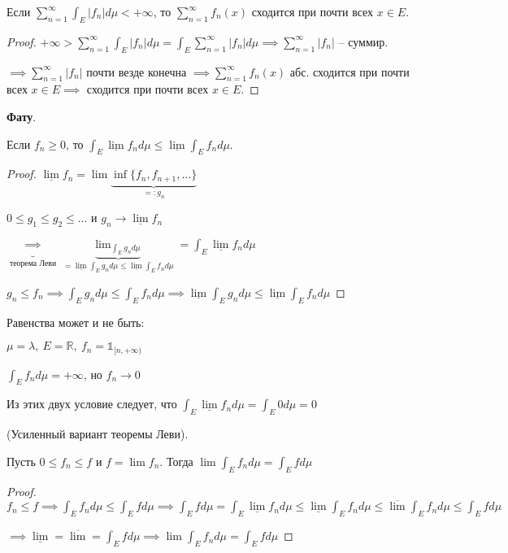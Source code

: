 \begin{consequence}
    Если $\sum_{n=1}^{\infty} \int_E{|f_n| d \mu} < +\infty$, то $\sum_{n=1}^{\infty} f_n(x)$ сходится при почти всех $x \in E$.
\end{consequence}
\begin{proof}
    $+\infty > \sum_{n=1}^{\infty} \int_E{|f_n| d \mu} = \int_E{\sum_{n=1}^{\infty} |f_n| d \mu} \implies \sum_{n=1}^{\infty} |f_n|$ -- суммир.

    $\implies \sum_{n=1}^{\infty} |f_n|$ почти везде конечна $\implies \sum_{n=1}^{\infty} f_n(x)$ абс. сходится при почти всех $x \in E \implies$ сходится при почти всех $x \in E$.
\end{proof}

\begin{lemma}
    \textbf{Фату}.

    Если $f_n \geq 0$, то $\int_E{\underline{\lim}{f_n d \mu}} \leq \underline{\lim}{\int_E{f_n d \mu}}$.
\end{lemma}
\begin{proof}
    $\underline{\lim}{f_n} = \lim{\underbrace{\inf\{ f_n, f_{n+1}, \dots \}}_{=: g_n}}$

    $0 \leq g_1 \leq g_2 \leq \dots$ и $g_n \rightarrow \underline{\lim}{f_n}$

    $\underbrace{\implies}_{\text{теорема Леви}} \underbrace{\lim_{\int_E{g_n d \mu}}}_{= \underline{\lim}{\int_E{g_n d \mu}} \leq \underline{\lim}{\int_E{f_n d \mu}}} = \int_E{\underline{\lim}{f_n d \mu}}$

    $g_n \leq f_n \implies \int_E{g_n d \mu} \leq \int_E{f_n d \mu} \implies \underline{\lim}{\int_E{g_n d \mu}} \leq \underline{\lim}{\int_E{f_n d \mu}}$
\end{proof}

\begin{remark}
    Равенства может и не быть:

    $\mu = \lambda, \ E = \mathbb{R}, \ f_n = \mathds{1}_{[n, +\infty)}$

    $\int_E{f_n d \mu} = +\infty$, но $f_n \rightarrow 0$

    Из этих двух условие следует, что $\int_E{\underline{\lim}{f_n d \mu}} = \int_E{0 d \mu} = 0$
\end{remark}



\begin{consequence}
    (Усиленный вариант теоремы Леви).

    Пусть $0 \leq f_n \leq f$ и $f = \lim{f_n}$. Тогда $\lim{\int_E{f_n d \mu}} = \int_E{f d \mu}$
\end{consequence}
\begin{proof}
    $f_n \leq f \implies \int_E{f_n d \mu} \leq \int_E{f d \mu} \implies \int_E{f d \mu} = \int_E{\underline{\lim}{f_n} d \mu} \leq \underline{\lim}{\int_E{f_n d \mu}} \leq \overline{\lim}{\int_E{f_n d \mu}} \leq \int_E{f d \mu}$

    $\implies \underline{\lim} = \overline{\lim} = \int_E{f d \mu} \implies \lim{\int_E{f_n d \mu}} = \int_E{f d \mu}$
\end{proof}

